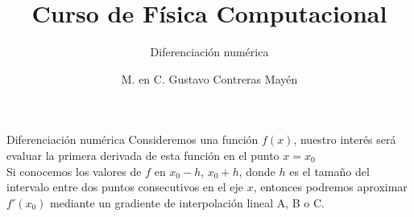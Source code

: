 \documentclass[pdf, azure]{prosper}
\title{Curso de Física Computacional}
\subtitle{Diferenciación numérica}
\author{M. en C. Gustavo Contreras Mayén}
\begin{document}
\maketitle
\begin{slide}{Diferenciación numérica}
Consideremos una función $f(x)$, nuestro interés será evaluar la primera derivada de esta función en el punto $x = x_{0}$
\\
Si conocemos los valores de $f$ en $x_{0}-h$, $x_{0}+h$, donde $h$ es el tamaño del intervalo entre dos puntos consecutivos en el eje $x$, entonces podremos aproximar $f'(x_{0})$ mediante un gradiente de interpolación lineal A, B o C.
\end{slide}
\end{document}
